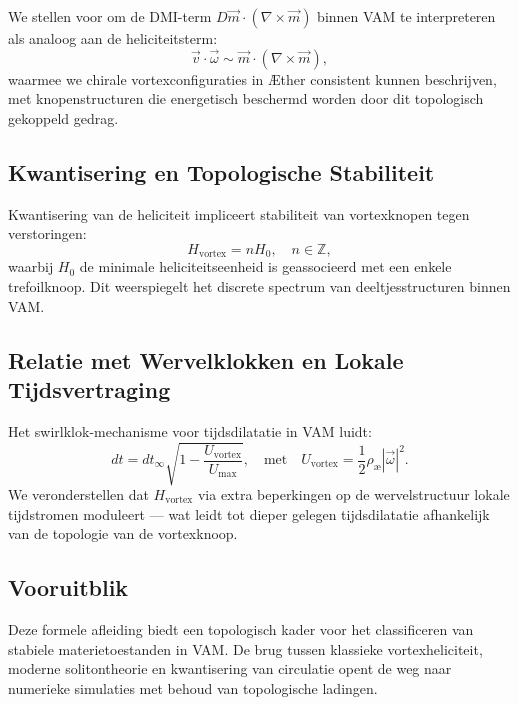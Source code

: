 We stellen voor om de DMI-term $D \vec{m} \cdot (\nabla \times \vec{m})$ binnen VAM te interpreteren als analoog aan de heliciteitsterm:
\begin{equation}
    \vec{v} \cdot \vec{\omega} \sim \vec{m} \cdot (\nabla \times \vec{m}),
\end{equation}
waarmee we chirale vortexconfiguraties in Æther consistent kunnen beschrijven, met knopenstructuren die energetisch beschermd worden door dit topologisch gekoppeld gedrag.

\subsection{Kwantisering en Topologische Stabiliteit}

Kwantisering van de heliciteit impliceert stabiliteit van vortexknopen tegen verstoringen:
\begin{equation}
    H_{\text{vortex}} = n H_0, \quad n \in \mathbb{Z},
\end{equation}
waarbij $H_0$ de minimale heliciteitseenheid is geassocieerd met een enkele trefoilknoop. Dit weerspiegelt het discrete spectrum van deeltjesstructuren binnen VAM.

\subsection{Relatie met Wervelklokken en Lokale Tijdsvertraging}

Het swirlklok-mechanisme voor tijdsdilatatie in VAM luidt:
\begin{equation}
    dt = dt_\infty \sqrt{1 - \frac{U_{\text{vortex}}}{U_{\text{max}}}},
    \quad \text{met} \quad
    U_{\text{vortex}} = \frac{1}{2} \rho_\text{\ae} |\vec{\omega}|^2.
\end{equation}
We veronderstellen dat $H_{\text{vortex}}$ via extra beperkingen op de wervelstructuur lokale tijdstromen moduleert — wat leidt tot dieper gelegen tijdsdilatatie afhankelijk van de topologie van de vortexknoop.

\subsection{Vooruitblik}

Deze formele afleiding biedt een topologisch kader voor het classificeren van stabiele materietoestanden in VAM. De brug tussen klassieke vortexheliciteit, moderne solitontheorie en kwantisering van circulatie opent de weg naar numerieke simulaties met behoud van topologische ladingen.